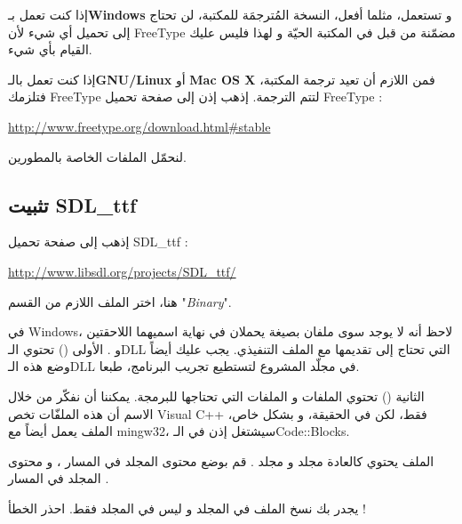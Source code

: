 إذا كنت تعمل بـ\textbf{\textenglish{Windows}}
و تستعمل، مثلما أفعل، النسخة المُترجمَة للمكتبة، لن تحتاج إلى تحميل أي شيء لأن
\textenglish{FreeType}
مضمّنة من قبل في المكتبة الحيّة
و لهذا فليس عليك القيام بأي شيء.

إذا كنت تعمل بالـ\textbf{\textenglish{GNU/Linux}}
أو
\textbf{\textenglish{Mac OS X}}
فمن اللازم أن تعيد ترجمة المكتبة، فتلزمك
\textenglish{FreeType}
لتتم الترجمة. إذهب إذن إلى صفحة تحميل
\textenglish{FreeType} :

\url{http://www.freetype.org/download.html#stable}

لنحمّل الملفات الخاصة بالمطورين.

\subsection{تثبيت \textenglish{SDL\_ttf}}

إذهب إلى  صفحة تحميل 
\textenglish{SDL\_ttf} :

\url{http://www.libsdl.org/projects/SDL_ttf/}

هنا، اختر الملف اللازم من القسم
"\textit{\textenglish{Binary}}".

\begin{information}
في
\textenglish{Windows}،
 لاحظ أنه لا يوجد سوى ملفان بصيغة 
يحملان في نهاية اسميهما اللاحقتين
و
.
الأولى 
()
تحتوي الـ\textenglish{DLL}
التي تحتاج إلى تقديمها مع الملف التنفيذي. يجب عليك أيضاً وضع هذه الـ\textenglish{DLL}
في مجلّد المشروع لتستطيع تجريب البرنامج، طبعا.

الثانية 
()
تحتوي الملفات 
و الملفات
التي تحتاجها للبرمجة. يمكننا أن نفكّر من خلال الاسم أن هذه الملفّات تخص
\textenglish{Visual C++}
فقط، لكن في الحقيقة، و بشكل خاص، الملف
يعمل أيضاً مع
\textenglish{mingw32}،
سيشتغل إذن في الـ\textenglish{Code::Blocks}.
\end{information}

الملف
يحتوي كالعادة مجلد
و مجلد
.
قم بوضع محتوى المجلد
في المسار
،
و محتوى المجلد
في المسار 
.

\begin{warning}
 يجدر بك نسخ الملف
في المجلد
و ليس في المجلد 
فقط. احذر الخطأ !
\end{warning}


